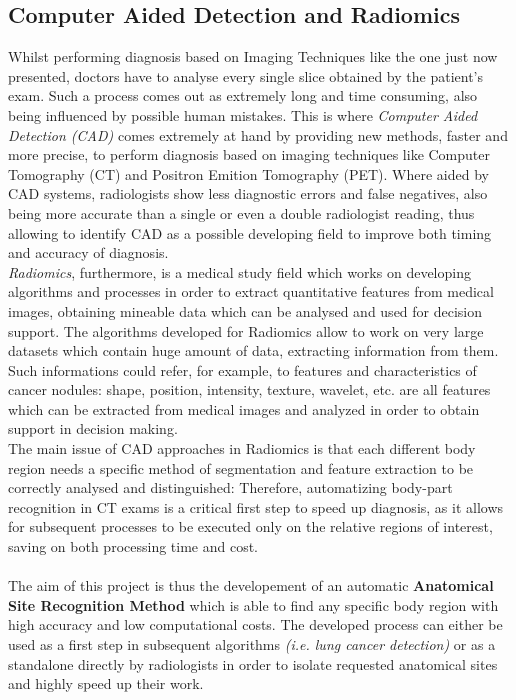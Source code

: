 \documentclass[../main.tex]{subfiles}
\begin{document}
\subsection{Computer Aided Detection and Radiomics}
Whilst performing diagnosis based on Imaging Techniques like the one just now presented, doctors have to analyse every single slice obtained by the patient's exam. Such a process comes out as extremely long and time consuming, also being influenced by possible human mistakes. This is where \textit{Computer Aided Detection (CAD)} comes extremely at hand by providing new methods, faster and more precise, to perform diagnosis based on imaging techniques like Computer Tomography (CT) and Positron Emition Tomography (PET). Where aided by CAD systems, radiologists show less diagnostic errors and false negatives, also being more accurate than a single or even a double radiologist reading,\cite{AlMohammad2017} thus allowing to identify CAD as a possible developing field to improve both timing and accuracy of diagnosis.\\
\textit{Radiomics}, furthermore, is a medical study field which works on developing algorithms and processes in order to extract quantitative features from medical images, obtaining mineable data which can be analysed and used for decision support.\cite{Gillies2016} The algorithms developed for Radiomics allow to work on very large datasets which contain huge amount of data, extracting information from them. Such informations could refer, for example, to features and characteristics of cancer nodules: shape, position, intensity, texture, wavelet, etc. are all features which can be extracted from medical images and analyzed in order to obtain support in decision making.\cite{Chen2017}\\
The main issue of CAD approaches in Radiomics is that each different body region needs a specific method of segmentation and feature extraction to be correctly analysed and distinguished\cite{Yan2016}: Therefore, automatizing body-part recognition in CT exams is a critical first step to speed up diagnosis, as it allows for subsequent processes to be executed only on the relative regions of interest, saving on both processing time and cost.\\
\\
The aim of this project is thus the developement of an automatic \textbf{Anatomical Site Recognition Method} which is able to find any specific body region with high accuracy and low computational costs. The developed process can either be used as a first step in subsequent algorithms \textit{(i.e. lung cancer detection)} or as a standalone directly by radiologists in order to isolate requested anatomical sites and highly speed up their work.
\end{document}

